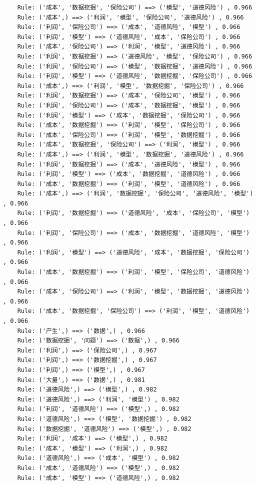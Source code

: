 \documentclass[lang=cn,11pt,a4paper,cite=authoryear]{elegantpaper}
\begin{document}
\begin{lstlisting}
	Rule: ('成本', '数据挖掘', '保险公司') ==> ('模型', '道德风险') , 0.966
	Rule: ('成本',) ==> ('利润', '模型', '保险公司', '道德风险') , 0.966
	Rule: ('利润', '保险公司') ==> ('成本', '道德风险', '模型') , 0.966
	Rule: ('利润', '模型') ==> ('道德风险', '成本', '保险公司') , 0.966
	Rule: ('成本', '保险公司') ==> ('利润', '模型', '道德风险') , 0.966
	Rule: ('利润', '数据挖掘') ==> ('道德风险', '模型', '保险公司') , 0.966
	Rule: ('利润', '保险公司') ==> ('模型', '数据挖掘', '道德风险') , 0.966
	Rule: ('利润', '模型') ==> ('道德风险', '数据挖掘', '保险公司') , 0.966
	Rule: ('成本',) ==> ('利润', '模型', '数据挖掘', '保险公司') , 0.966
	Rule: ('利润', '数据挖掘') ==> ('成本', '保险公司', '模型') , 0.966
	Rule: ('利润', '保险公司') ==> ('成本', '数据挖掘', '模型') , 0.966
	Rule: ('利润', '模型') ==> ('成本', '数据挖掘', '保险公司') , 0.966
	Rule: ('成本', '数据挖掘') ==> ('利润', '模型', '保险公司') , 0.966
	Rule: ('成本', '保险公司') ==> ('利润', '模型', '数据挖掘') , 0.966
	Rule: ('成本', '数据挖掘', '保险公司') ==> ('利润', '模型') , 0.966
	Rule: ('成本',) ==> ('利润', '模型', '数据挖掘', '道德风险') , 0.966
	Rule: ('利润', '数据挖掘') ==> ('成本', '道德风险', '模型') , 0.966
	Rule: ('利润', '模型') ==> ('成本', '数据挖掘', '道德风险') , 0.966
	Rule: ('成本', '数据挖掘') ==> ('利润', '模型', '道德风险') , 0.966
	Rule: ('成本',) ==> ('利润', '数据挖掘', '保险公司', '道德风险', '模型') , 0.966
	Rule: ('利润', '数据挖掘') ==> ('道德风险', '成本', '保险公司', '模型') , 0.966
	Rule: ('利润', '保险公司') ==> ('成本', '数据挖掘', '道德风险', '模型') , 0.966
	Rule: ('利润', '模型') ==> ('道德风险', '成本', '数据挖掘', '保险公司') , 0.966
	Rule: ('成本', '数据挖掘') ==> ('利润', '模型', '保险公司', '道德风险') , 0.966
	Rule: ('成本', '保险公司') ==> ('利润', '模型', '数据挖掘', '道德风险') , 0.966
	Rule: ('成本', '数据挖掘', '保险公司') ==> ('利润', '模型', '道德风险') , 0.966
	Rule: ('产生',) ==> ('数据',) , 0.966
	Rule: ('数据挖掘', '问题') ==> ('数据',) , 0.966
	Rule: ('利润',) ==> ('保险公司',) , 0.967
	Rule: ('利润',) ==> ('数据挖掘',) , 0.967
	Rule: ('利润',) ==> ('模型',) , 0.967
	Rule: ('大量',) ==> ('数据',) , 0.981
	Rule: ('道德风险',) ==> ('模型',) , 0.982
	Rule: ('道德风险',) ==> ('利润', '模型') , 0.982
	Rule: ('利润', '道德风险') ==> ('模型',) , 0.982
	Rule: ('道德风险',) ==> ('模型', '数据挖掘') , 0.982
	Rule: ('数据挖掘', '道德风险') ==> ('模型',) , 0.982
	Rule: ('利润', '成本') ==> ('模型',) , 0.982
	Rule: ('成本', '模型') ==> ('利润',) , 0.982
	Rule: ('道德风险',) ==> ('成本', '模型') , 0.982
	Rule: ('成本', '道德风险') ==> ('模型',) , 0.982
	Rule: ('成本', '模型') ==> ('道德风险',) , 0.982

\end{lstlisting}
\end{document}
